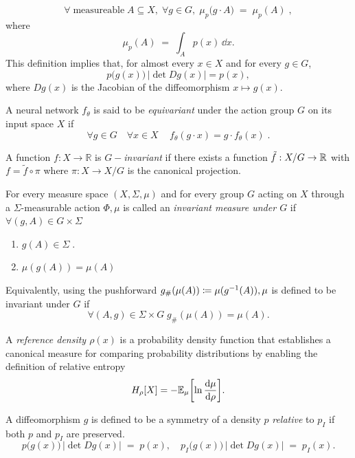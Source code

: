 \begin{description}
\[
    \forall \;\text{measureable} \;A \subseteq X,\; \forall g\in G,\;
    \mu_p\bigl(g\cdot A\bigr)\;=\;\mu_p(A)\;,
\]
where \[
    \mu_p(A)\;=\;\int_A p(x)\,\dd x.
    \]
This definition implies that, for almost every $x\in X$ and for every $g\in G$,
\[
    p\bigl(g(x)\bigr)\,\bigl|\det Dg(x)\bigr| = p(x),
\]
where $Dg(x)$ is the Jacobian of the diffeomorphism $x\mapsto g(x)$.

\item [Equivariant neural network.]
        A neural network \(f_\theta\) is said to be \textit{equivariant} under the action group \(G\) on its input space \(X\) if
        \[
            \forall g\in G\quad\forall x\in X\quad\,f_\theta(g \cdot x) = g \cdot f_\theta(x)\;.
        \]

\item [Group invariant function]
        A function \(f: X \rightarrow \mathbb{R}\) is \(G-\)\emph{invariant} if there exists a function \(\tilde{f}: X/G \rightarrow \mathbb{R}\) with \(f = \tilde{f} \circ \pi\) where \(\pi: X \rightarrow X/G\) is the canonical projection.

\item [Invariant measure]
    For every measure space $(X,\Sigma,\mu)$ and for every group $G$ acting on $X$ through a $\Sigma$-measurable action \(\Phi, \mu\) is called an \emph{invariant measure under \(G\)} if \(\forall (g, A) \in G\times \Sigma\)
    \begin{enumerate}
        \item \(g(A)\in\Sigma\;.\)
        \item     \(
    \mu(g(A))=\mu(A)
    \)
    \end{enumerate}
    Equivalently, using the pushforward \(g_\#(\mu(A))\coloneqq \mu(g^{-1}(A)), \mu\) is defined to be invariant under \(G\) if
    \[
    \forall (A, g) \in\Sigma\times G\; g_\#(\mu(A)) = \mu(A).
    \]

\item [Reference density]
        A \emph{reference density \(\rho(x)\)} is a probability density function that establishes a canonical measure for comparing probability distributions by enabling the definition of relative entropy
        \[
            H_\rho[X] = -\mathbb{E}_\mu\qty[\ln\frac{\dd\mu}{\dd\rho}].
        \]

\item [Relative symmetry.]
        A diffeomorphism $g$ is defined to be a symmetry of a density $p$ \emph{relative} to $p_I$ if both $p$ and $p_I$ are preserved.
    \begin{equation}
        p\bigl(g(x)\bigr)\,\bigl|\det Dg(x)\bigr|
        \;=\; p(x),
        \quad
        p_I\bigl(g(x)\bigr)\,\bigl|\det Dg(x)\bigr|
        \;=\; p_I(x).
    \end{equation}


\end{description}
